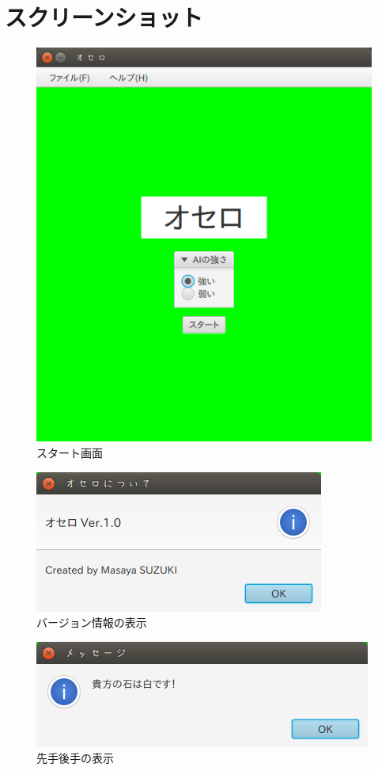 \documentclass[uplatex,titlepage]{jsarticle}
\begin{document}
\section{スクリーンショット}
\begin{figure}[h]
\begin{center}
\includegraphics[scale=0.5]{オセロ_036}
\caption{スタート画面}
\end{center}
\end{figure}
\begin{figure}[h]
\begin{center}
\includegraphics[scale=0.5]{オセロについて_037}
\caption{バージョン情報の表示}
\end{center}
\end{figure}
\begin{figure}[h]
\begin{center}
\includegraphics[scale=0.5]{メッセージ_038}
\caption{先手後手の表示}
\end{center}
\end{figure}
\end{document}
